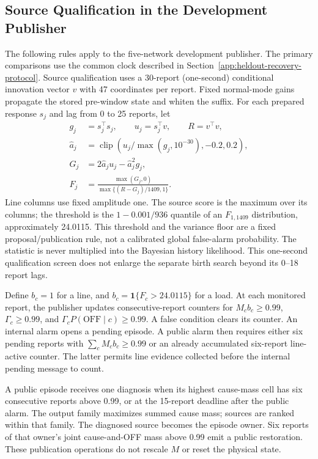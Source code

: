 \subsection{Source Qualification in the Development Publisher}
\label{app:publication-rules}

The following rules apply to the five-network development publisher.
The primary comparisons use the common clock described in
Section~\ref{app:heldout-recovery-protocol}. Source qualification
uses a 30-report (one-second) conditional innovation vector $v$ with 47
coordinates per report. Fixed normal-mode gains propagate the stored
pre-window state and whiten the suffix. For each prepared response $s_j$
and lag from 0 to 25 reports, let
\begin{align}
 g_j&=s_j^\top s_j,\qquad u_j=s_j^\top v,\qquad R=v^\top v,\nonumber\\
 \widehat a_j&=\operatorname{clip}(u_j/\max(g_j,10^{-30}),-0.2,0.2),\nonumber\\
 G_j&=2\widehat a_j u_j-\widehat a_j^2g_j,\nonumber\\
 F_j&=\frac{\max(G_j,0)}{\max\{(R-G_j)/1409,1\}}.
 \label{eq:supp-source-screen}
\end{align}
Line columns use fixed amplitude one. The source score is the maximum
over its columns; the threshold is the $1-0.001/936$ quantile of an
$F_{1,1409}$ distribution, approximately 24.0115. This threshold and the
variance floor are a fixed proposal/publication rule, not a calibrated
global false-alarm probability. The statistic is never multiplied into
the Bayesian history likelihood. This one-second qualification screen
does not enlarge the separate birth search beyond its 0--18 report lags.

Define $b_c=1$ for a line, and $b_c=\mathbf1\{F_c>24.0115\}$ for a
load. At each monitored report, the publisher updates consecutive-report
counters for $M_cb_c\ge0.99$, $\Gamma_c\ge0.99$, and
$\Gamma_cP(\mathrm{OFF}\mid c)\ge0.99$. A false condition clears its
counter. An internal alarm opens a pending episode. A public alarm then
requires either six pending reports with $\sum_c M_cb_c\ge0.99$ or an
already accumulated six-report line-active counter. The latter permits
line evidence collected before the internal pending message to count.

A public episode receives one diagnosis when its highest cause-mass cell
has six consecutive reports above 0.99, or at the 15-report deadline after
the public alarm. The output family maximizes summed cause mass; sources
are ranked within that family. The diagnosed source becomes the episode
owner. Six reports of that owner's joint cause-and-OFF mass above 0.99
emit a public restoration. These publication operations do not rescale
$M$ or reset the physical state.

